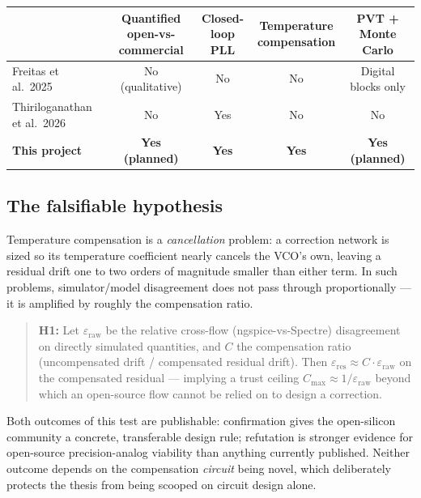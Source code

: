 \documentclass[11pt]{article}
\begin{document}
\begin{table}[h]
\centering
\small
\begin{tabular}{lcccc}
\toprule
 & \shortstack{Quantified\\open-vs-commercial} & \shortstack{Closed-loop\\PLL} & \shortstack{Temperature\\compensation} & \shortstack{PVT +\\Monte Carlo} \\
\midrule
Freitas et al.\ 2025 & No (qualitative) & No & No & Digital blocks only \\
Thiriloganathan et al.\ 2026 & No & Yes & No & No \\
\textbf{This project} & \textbf{Yes (planned)} & \textbf{Yes} & \textbf{Yes} & \textbf{Yes (planned)} \\
\bottomrule
\end{tabular}
\end{table}

\subsection{The falsifiable hypothesis}

Temperature compensation is a \emph{cancellation} problem: a correction network is sized so its temperature coefficient nearly cancels the VCO's own, leaving a residual drift one to two orders of magnitude smaller than either term. In such problems, simulator/model disagreement does not pass through proportionally --- it is amplified by roughly the compensation ratio.

\begin{quote}
\textbf{H1:} Let $\varepsilon_{\text{raw}}$ be the relative cross-flow (ngspice-vs-Spectre) disagreement on directly simulated quantities, and $C$ the compensation ratio (uncompensated drift / compensated residual drift). Then $\varepsilon_{\text{res}} \approx C \cdot \varepsilon_{\text{raw}}$ on the compensated residual --- implying a trust ceiling $C_{\max} \approx 1/\varepsilon_{\text{raw}}$ beyond which an open-source flow cannot be relied on to design a correction.
\end{quote}

Both outcomes of this test are publishable: confirmation gives the open-silicon community a concrete, transferable design rule; refutation is stronger evidence for open-source precision-analog viability than anything currently published. Neither outcome depends on the compensation \emph{circuit} being novel, which deliberately protects the thesis from being scooped on circuit design alone.
\end{document}
